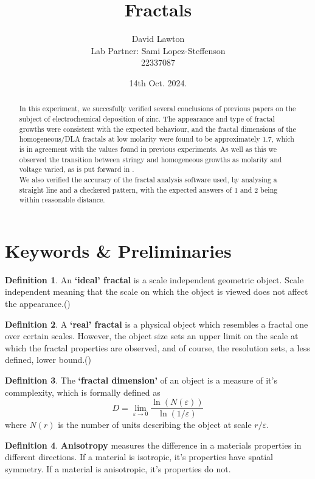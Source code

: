 \documentclass{article}
\title{Fractals}
\author{David Lawton\\
        Lab Partner: Sami Lopez-Steffenson\\
        22337087}
\date{14th Oct. 2024.}
\theoremstyle{definition}
\newtheorem{definition}{Definition}[section]
\theoremstyle{remark}
\begin{document}
\maketitle

\tableofcontents
{}
\begin{abstract}
        In this experiment, we succesfully verified several conclusions of previous papers on the subject of electrochemical deposition of zinc. The appearance and type of fractal growths were consistent with the expected behaviour, and the fractal dimensions of the homogeneous/DLA fractals at low molarity were found to be approximately $1.7$, which is in agreement with the values found in previous experiments. As well as this we observed the transition between stringy and homogeneous growths as molarity and voltage varied, as is put forward in \cite{PhysRevLett.59.2315}. \\
        \indent We also verified the accuracy of the fractal analysis software used, by analysing a straight line and a checkered pattern, with the expected answers of 1 and 2 being within reasonable distance.\\
\end{abstract}

\section{Keywords \& Preliminaries}\label{sec:keywords}
\begin{definition}
        An \textbf{`ideal' fractal} is a scale independent geometric object. Scale independent meaning that the scale on which the object is viewed does not affect the appearance.(\cite{LabHandbook})
\end{definition}
\begin{definition}
        A \textbf{`real' fractal} is a physical object which resembles a fractal one over certain scales. However, the object size sets an upper limit on the scale at which the fractal properties are observed, and of course, the resolution sets, a less defined, lower bound.(\cite{LabHandbook})
\end{definition}
\begin{definition}
        The \textbf{`fractal dimension'} of an object is a measure of it's commplexity, which is formally defined as
\begin{equation}
        \label{eq:fractal_dimension}
        D = \lim_{\varepsilon \to 0} \frac{\ln(N(\varepsilon))}{\ln(1/\varepsilon)}
\end{equation}
        where $N(r)$ is the number of units describing the object at scale $r/\varepsilon$.
\end{definition}
\begin{definition}
        \textbf{Anisotropy} measures the difference in a materials properties in different directions. If a material is isotropic, it's properties have spatial symmetry. If a material is anisotropic, it's properties do not. 
\end{definition}
\end{document}
